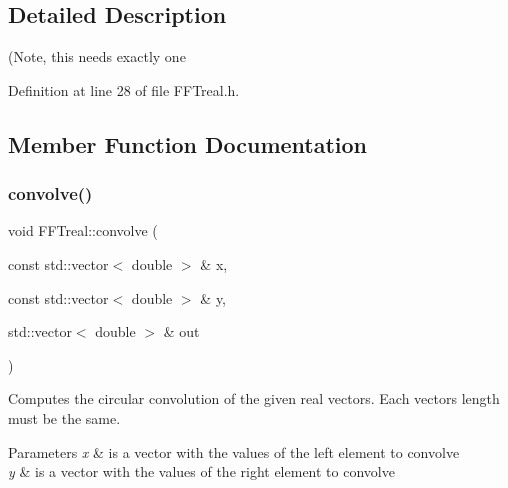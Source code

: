 \subsection{Detailed Description}
(Note, this needs exactly one 

Definition at line 28 of file F\+F\+Treal.\+h.



\subsection{Member Function Documentation}
\mbox{\label{class_f_f_treal_a8c7ae7505d1c80b4471a30585801d64b}} 
\subsubsection{\texorpdfstring{convolve()}{convolve()}\hspace{0.1cm}{\footnotesize\ttfamily [1/2]}}
{\footnotesize\ttfamily void F\+F\+Treal\+::convolve (\begin{DoxyParamCaption}\item[{const std\+::vector$<$ double $>$ \&}]{x,  }\item[{const std\+::vector$<$ double $>$ \&}]{y,  }\item[{std\+::vector$<$ double $>$ \&}]{out }\end{DoxyParamCaption})}



Computes the circular convolution of the given real vectors. Each vector\textquotesingle{}s length must be the same. 


\begin{DoxyParams}{Parameters}
{\em x} & is a vector with the values of the left element to convolve \\
\hline
{\em y} & is a vector with the values of the right element to convolve \\
\hline
\end{DoxyParams}
\mbox{\label{class_f_f_treal_a375983c9725f461611341061dbdcc92f}} 
